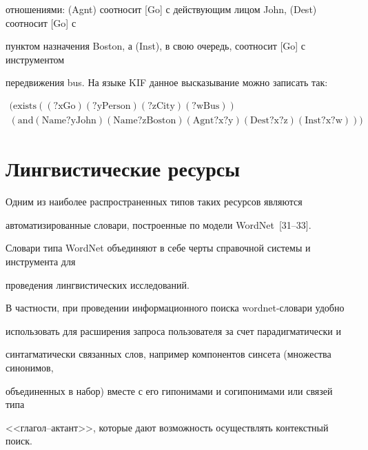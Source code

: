 отношениями: (Agnt) соотносит [Go] с действующим лицом John, (Dest) соотносит [Go] с 


пунктом назначения Boston, а (Inst), в свою очередь, соотносит [Go] с инструментом 


передвижения bus. На языке KIF данное высказывание можно записать так: 


\begin{multline*}


\mathrm{(exists ((?x Go)  (?y Person) (?z City) (?w Bus))} \\


\mathrm{(and (Name ?y John) (Name ?z Boston) (Agnt ?x ?y) (Dest ?x 


?z) (Inst ?x ?w)))}


\end{multline*}










   \section{Лингвистические ресурсы}


   


      Одним из наиболее распространенных типов таких ресурсов являются 


автоматизированные словари, построенные по модели WordNet~[31--33]. 


Словари типа WordNet объединяют в себе черты справочной системы и инструмента для 


проведения лингвистических исследований.


      


      В частности, при проведении информационного поиска wordnet-словари удобно 


использовать для расширения запроса пользователя за счет парадигматически и 


синтагматически связанных слов, например компонентов синсета (множества синонимов, 


объединенных в набор) вместе с его гипонимами и согипонимами или связей типа 


<<глагол--актант>>, которые дают возможность осуществлять контекстный поиск. 


